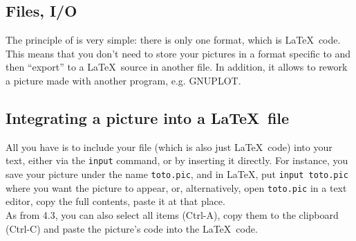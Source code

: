 \documentclass[11pt,a4paper]{article}
\begin{document}
\subsection{Files, I/O} The principle of {\TC} is very simple:
there is only one format, which is \LaTeX\, code.
This means that you don't need to store your pictures in
a format specific to {\TC} and then ``export'' to a \LaTeX\, source in
another file. In addition, it allows to rework a picture made with
another program, e.g. GNUPLOT.

\subsection{Integrating a {\TC} picture into a \LaTeX\, file}
\label{insert}
All you have is to include your {\TC} file (which is also just \LaTeX\, code)
into your text, either via the {\tt \bs input} command, or by inserting
it directly.
%
For instance, you save your picture under the name {\tt toto.pic},
and in \LaTeX, put {\tt \bs input toto.pic} where you want the picture
to appear, or, alternatively, open {\tt toto.pic} in a text editor, copy
the full contents, paste it at that place.\\
As from {\TC} 4.3, you can also select all items (Ctrl-A),
copy them to the clipboard (Ctrl-C) and paste the picture's code into
the \LaTeX\, code.
\end{document}
